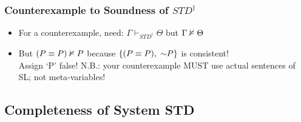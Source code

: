 \begin{frame}
\frametitle{Counterexample to Soundness of $STD^{\dagger}$}

\begin{itemize}[<+->]

\item For a counterexample, need: $\Gamma \vdash_{STD^{\dagger}} \Theta$ but $\Gamma \nvDash \Theta$


\medskip



\medskip

\item<3-> But $(P \equiv P) \nvDash P$ because  $\{(P \eiff P), \; \enot P\}$ is consistent! \\ Assign `P' false! N.B.: your counterexample MUST use actual sentences of SL; not meta-variables!

\end{itemize}



\end{frame}
























\subsection{Completeness of System STD}

